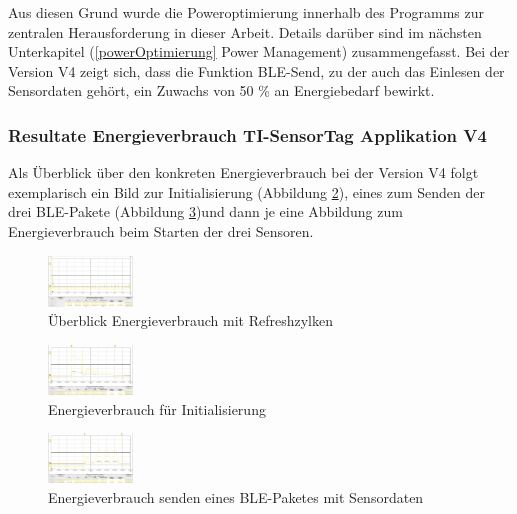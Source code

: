 Aus diesen Grund wurde die Poweroptimierung innerhalb des Programms zur zentralen Herausforderung in dieser Arbeit. Details darüber sind im nächsten Unterkapitel (\ref{powerOptimierung} Power Management) zusammengefasst. Bei der Version V4 zeigt sich, dass die Funktion BLE-Send, zu der auch das Einlesen der Sensordaten gehört, ein Zuwachs von 50 \% an Energiebedarf bewirkt. 



\subsubsection{Resultate Energieverbrauch TI-SensorTag Applikation V4}
\label{energie senosortag} 

Als Überblick über den konkreten Energieverbrauch bei der Version V4 folgt exemplarisch ein Bild zur Initialisierung (Abbildung \ref{energie_init}), eines zum Senden der drei BLE-Pakete (Abbildung \ref{energie_senden})und dann je eine Abbildung zum Energieverbrauch beim Starten der drei Sensoren.

\begin{figure}[ht]
  \includegraphics[width=0.2\textwidth]{3Vorgehen/imag/Ueberblick.png}
  \caption{Überblick Energieverbrauch mit Refreshzylken}
  \label{energie_ueberblick}
\end{figure}

\newpage
\begin{figure}[ht]
  \includegraphics[width=0.2\textwidth]{3Vorgehen/imag/Init.png}
  \caption{Energieverbrauch für Initialisierung}
  \label{energie_init}
\end{figure}


\begin{figure}[ht]
  \includegraphics[width=0.2\textwidth]{3Vorgehen/imag/Senden.png}
  \caption{Energieverbrauch senden eines BLE-Paketes mit Sensordaten}
  \label{energie_senden}
\end{figure}

